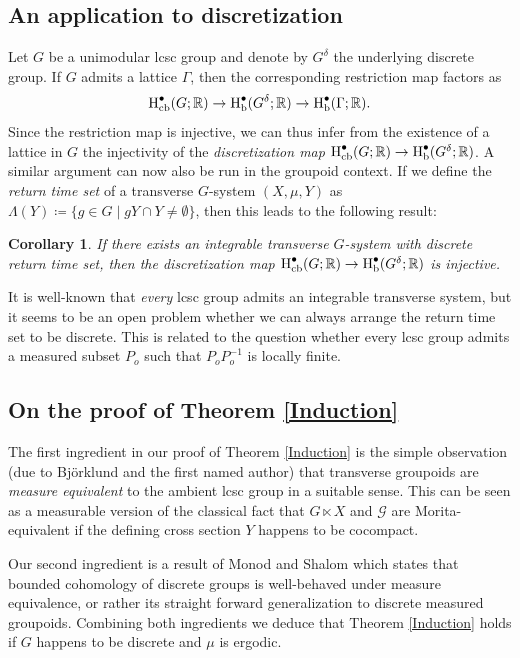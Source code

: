 \documentclass[11pt, oneside]{amsart}
\newtheorem{intro_cor}[intro_thm]{Corollary}
\theoremstyle{definition}
\theoremstyle{remark}
\theoremstyle{TheoremNum}
\newcommand{\Hb}{\textup{H}_{\textup{b}}}
\newcommand{\Hcb}{\textup{H}_{\textup{cb}}}
\newcommand{\cG}{\mathcal{G}}
\newcommand{\bR}{\mathbb{R}}
\begin{document}
\subsection{An application to discretization}

Let $G$ be a unimodular lcsc group and denote by $G^\delta$ the underlying discrete group. If $G$ admits a lattice $\Gamma$, then the corresponding restriction map factors as
\[
\Hcb^\bullet(G; \bR) \to \Hb^\bullet(G^\delta; \bR) \to\Hb^\bullet(\Gamma; \bR).
\]
Since the restriction map is injective, we can thus infer from the existence of a lattice in $G$ the injectivity of the \emph{discretization map} $\Hcb^\bullet(G; \bR) \to \Hb^\bullet(G^\delta; \bR)$. A similar argument can now also be run in the groupoid context. If we define the \emph{return time set} of a transverse $G$-system $(X, \mu, Y)$ as $\Lambda(Y) \coloneqq \{g \in G \mid gY \cap Y \neq \emptyset\}$, then this leads to the following result:
\begin{intro_cor}\label{Discretization} If there exists an integrable transverse $G$-system with discrete return time set, then the discretization map $\Hcb^\bullet(G; \bR) \to \Hb^\bullet(G^\delta; \bR)$ is injective.
\end{intro_cor}
It is well-known that \emph{every} lcsc group admits an integrable transverse system, but it seems to be an open problem whether we can always arrange the return time set to be discrete. This is related to the question whether every lcsc group admits a measured subset $P_o$ such that $P_oP_o^{-1}$ is locally finite.

\subsection{On the proof of Theorem \ref{Induction}}
The first ingredient in our proof of Theorem \ref{Induction} is the simple observation (due to Bj\"orklund and the first named author) that transverse groupoids are \emph{measure equivalent} to the ambient lcsc group in a suitable sense. This can be seen as a measurable version of the classical fact that $G \ltimes X$ and $\cG$ are Morita-equivalent if the defining cross section $Y$ happens to be cocompact.

Our second ingredient is a result of Monod and Shalom \cite{MonShal} which states that bounded cohomology of discrete groups is well-behaved under measure equivalence, or rather its straight forward generalization to discrete measured groupoids. Combining both ingredients we deduce that Theorem \ref{Induction} holds if $G$ happens to be discrete and $\mu$ is ergodic.
\end{document}

